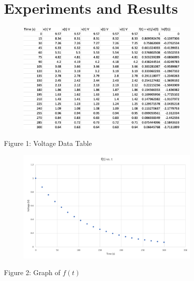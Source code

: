 \documentclass[12pt]{article}
\begin{document}
    \section*{Experiments and Results}
    \begin{figure}[h]
        \centering
        \includegraphics[width=0.75\textwidth]{Data Table.png}
    \end{figure}
    \begin{center}
        Figure 1: Voltage Data Table
    \end{center}
    \begin{figure}[h]
        \centering
        \includegraphics[width=0.8\textwidth]{5.1 Graph 1.png}
    \end{figure}
    \begin{center}
        Figure 2: Graph of $f(t)$
    \end{center}
    \newpage
\end{document}
